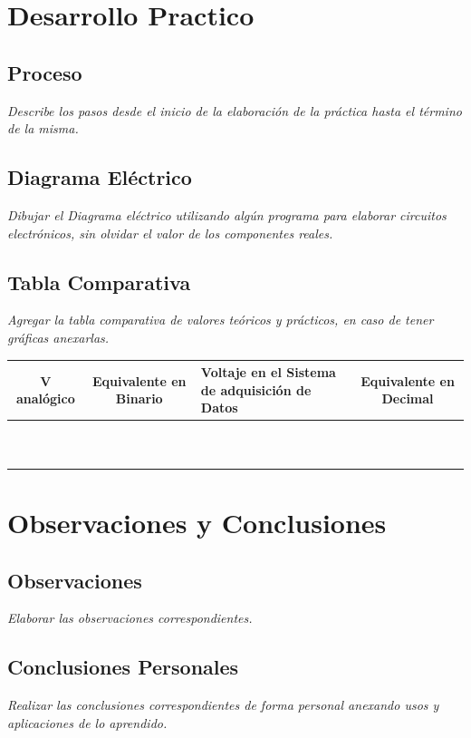 \documentclass[11pt]{scrartcl}
\newcommand{\indicacion}[1]{\noindent\textit{\small #1}}
\begin{document}
\section{Desarrollo Practico}
\subsection{Proceso}
\indicacion{
    Describe los pasos desde el inicio de la elaboración de la práctica hasta el término de la misma.
}

\subsection{Diagrama Eléctrico}
\indicacion{
    Dibujar el Diagrama eléctrico utilizando algún programa para elaborar circuitos electrónicos, sin olvidar el valor de los componentes reales.
}

\subsection{Tabla Comparativa}

\indicacion{
    Agregar la tabla comparativa de valores teóricos y prácticos, en caso de tener gráficas anexarlas.
}

\begin{center}
\begin{tabular}{|c|c|p{3cm}|c|}
\hline
\textbf{V analógico}&\textbf{Equivalente en Binario} &\textbf{Voltaje en el Sistema de adquisición de Datos} & \textbf{Equivalente en Decimal}\\
\hline
& & & \\
\hline
& & & \\
\hline
& & & \\
\hline
& & & \\
\hline
& & & \\
\hline
& & & \\
\hline
& & & \\
\hline
& & & \\
\hline
& & & \\
\hline
& & & \\
\hline
\end{tabular}
\end{center}

\section{Observaciones y Conclusiones}

\subsection{Observaciones}
\indicacion{
    Elaborar las observaciones correspondientes.
}

\subsection{Conclusiones Personales}
\indicacion{
    Realizar las conclusiones correspondientes de forma personal anexando usos y aplicaciones de lo aprendido.
}


  

    
\end{document}
